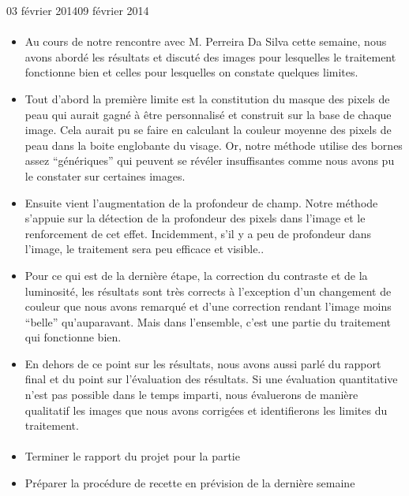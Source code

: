 \documentclass[11pt, french]{report-rd-info}
\begin{document}
\begin{fichesuivi}{03 février 2014}{09 février 2014}
\paragraph{}
	\begin{echange}
		\begin{itemize}
			\item Au cours de notre rencontre avec M. Perreira Da Silva cette semaine, nous avons abordé les résultats et discuté des images pour lesquelles le traitement fonctionne bien et celles pour lesquelles on constate quelques limites.
			\item Tout d’abord la première limite est la constitution du masque des pixels de peau qui aurait gagné à être personnalisé et construit sur la base de chaque image. Cela aurait pu se faire en calculant la couleur moyenne des pixels de peau dans la boite englobante du visage. Or, notre méthode utilise des bornes assez “génériques” qui peuvent se révéler insuffisantes comme nous avons pu le constater sur certaines images.
			\item Ensuite vient l’augmentation de la profondeur de champ. Notre méthode s’appuie sur la détection de la profondeur des pixels dans l’image et le renforcement de cet effet. Incidemment, s’il y a peu de profondeur dans l’image, le traitement sera peu efficace et visible..
	\item Pour ce qui est de la dernière étape, la correction du contraste et de la luminosité, les résultats sont très corrects à l’exception d’un changement de couleur que nous avons remarqué et d’une correction rendant l’image moins “belle” qu’auparavant. Mais dans l’ensemble, c’est une partie du traitement qui fonctionne bien.
	\item En dehors de ce point sur les résultats, nous avons aussi parlé du rapport final et du point sur l’évaluation des résultats. Si une évaluation quantitative n’est pas possible dans le temps imparti, nous évaluerons de manière qualitatif les images que nous avons corrigées et identifierons les limites du traitement.
		\end{itemize}
	\end{echange}

\paragraph*{}
	\begin{planification}
		\begin{itemize}
			\item Terminer le rapport du projet pour la partie 
			\item Préparer la procédure de recette en prévision de la dernière semaine
\end{itemize}
	\end{planification}
\end{fichesuivi}
\end{document}
